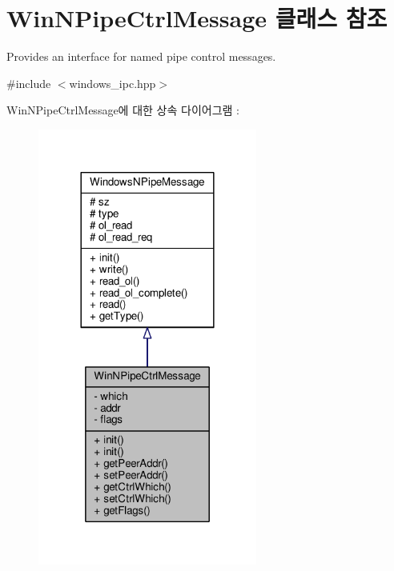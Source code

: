 \hypertarget{class_win_n_pipe_ctrl_message}{}\section{Win\+N\+Pipe\+Ctrl\+Message 클래스 참조}
\label{class_win_n_pipe_ctrl_message}


Provides an interface for named pipe control messages.  




{\ttfamily \#include $<$windows\+\_\+ipc.\+hpp$>$}



Win\+N\+Pipe\+Ctrl\+Message에 대한 상속 다이어그램 \+: 
\nopagebreak
\begin{figure}[H]
\begin{center}
\leavevmode
\includegraphics[width=204pt]{class_win_n_pipe_ctrl_message__inherit__graph}
\end{center}
\end{figure}


